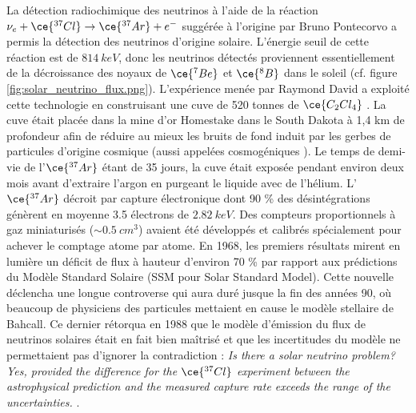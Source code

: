 La détection radiochimique des neutrinos à l'aide de la réaction $\nu_e + \ce{^{37}Cl} \rightarrow \ce{^{37}Ar} + e^-$ suggérée à l'origine par Bruno Pontecorvo a permis la détection des neutrinos d'origine solaire. L'énergie seuil de cette réaction est de $\SI{814}{keV}$, donc les neutrinos détectés proviennent essentiellement de la décroissance des noyaux de $\ce{^7Be}$ et $\ce{^8B}$ dans le soleil \cite{Bahcall:1987jc} (cf. figure \ref{fig:solar_neutrino_flux.png}). L'expérience menée par Raymond David a exploité cette technologie en construisant une cuve de 520 tonnes de $\ce{C_2Cl_4}$ \cite{Davis:1968cp}. La cuve était placée dans la mine d'or Homestake dans le South Dakota à 1,4 km de profondeur afin de réduire au mieux les bruits de fond induit par les gerbes de particules d'origine cosmique (aussi appelées \og cosmogéniques \fg{}). Le temps de demi-vie de l'$\ce{^{37}Ar}$ étant de 35 jours, la cuve était exposée pendant environ deux mois avant d'extraire l'argon en purgeant le liquide avec de l'hélium.  L'$\ce{^{37}Ar}$ décroit par capture électronique dont 90 \% des désintégrations génèrent en moyenne 3.5 électrons de $\SI{2.82}{keV}$. Des compteurs proportionnels à gaz miniaturisés ($\sim\SI{0.5}{cm^3}$) avaient été développés et calibrés spécialement pour achever le comptage atome par atome. En 1968, les premiers résultats mirent en lumière un déficit de flux à hauteur d'environ 70 \% par rapport aux prédictions du Modèle Standard Solaire (SSM pour Solar Standard Model). Cette nouvelle déclencha une longue controverse qui aura duré jusque la fin des années 90, où beaucoup de physiciens des particules mettaient en cause le modèle stellaire de Bahcall. Ce dernier rétorqua en 1988 que le modèle d'émission du flux de neutrinos solaires était en fait bien maîtrisé et que les incertitudes du modèle ne permettaient pas d'ignorer la contradiction :  \og \textit{Is there a solar neutrino problem? Yes, provided the difference for the $\ce{^{37}Cl}$ experiment between the astrophysical prediction and the measured capture rate exceeds the range of the uncertainties.} \fg{} \cite{Bahcall:1987jc}.\\

